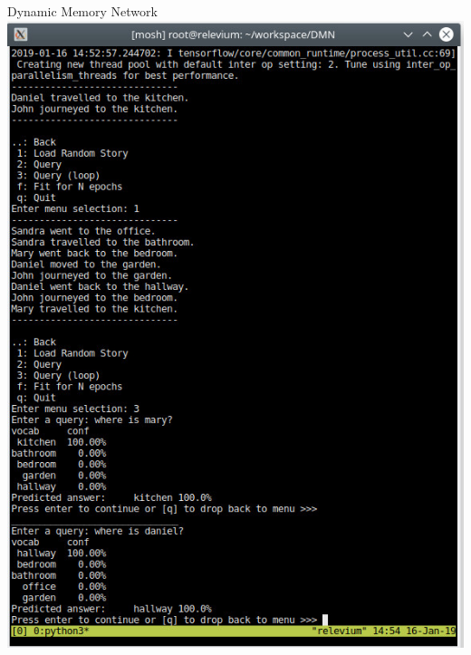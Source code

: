 \documentclass{beamer}
\begin{document}
\begin{frame}{Dynamic Memory Network}
{
\centering\includegraphics[width=.6\textwidth]{ml_imgs/dmn_crop.jpg}
}
\end{frame}
\end{document}
